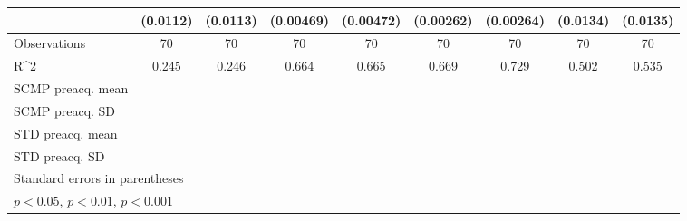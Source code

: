 \begin{sidewaystable}[htbp]
\begin{tabular}{l*{8}{c}}
                & (0.0112)         & (0.0113)         &(0.00469)         &(0.00472)         &(0.00262)         &(0.00264)         & (0.0134)         & (0.0135)         \\
\hline
Observations    &       70         &       70         &       70         &       70         &       70         &       70         &       70         &       70         \\
R^2             &    0.245         &    0.246         &    0.664         &    0.665         &    0.669         &    0.729         &    0.502         &    0.535         \\
SCMP preacq. mean&                  &                  &                  &                  &                  &                  &                  &                  \\
SCMP preacq. SD &                  &                  &                  &                  &                  &                  &                  &                  \\
STD preacq. mean&                  &                  &                  &                  &                  &                  &                  &                  \\
STD preacq. SD  &                  &                  &                  &                  &                  &                  &                  &                  \\
\hline\hline
\multicolumn{9}{l}{\footnotesize Standard errors in parentheses}\\
\multicolumn{9}{l}{\footnotesize \sym{*} \(p<0.05\), \sym{**} \(p<0.01\), \sym{***} \(p<0.001\)}\\
\end{tabular}
\end{sidewaystable}
